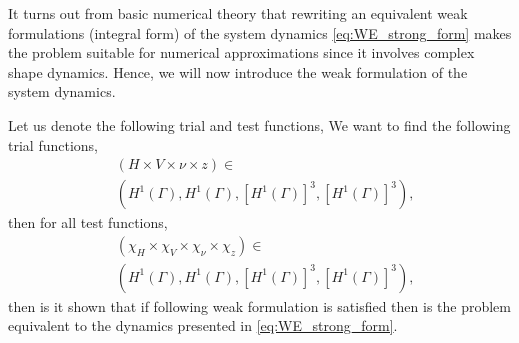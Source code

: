 It turns out from basic numerical theory that rewriting an equivalent weak formulations (integral form) of the system dynamics \eqref{eq:WE_strong_form} makes the problem suitable for numerical approximations since it involves complex shape dynamics.
Hence, we will now introduce the weak formulation of the system dynamics.

Let us denote the following trial and test functions,
We want to find the following trial functions,
\[
    \begin{split}
& ( H \times V \times \nu  \times z ) \in \\
&\left( H^{1}\left( \Gamma  \right), H^1 \left( \Gamma  \right), \left[ H^{1} \left( \Gamma  \right)  \right] ^3, \left[ H^{1}\left( \Gamma  \right)  \right]^3   \right),
    \end{split}
\]
then for all test functions,
\[
    \begin{split}
& ( \chi_{H}  \times \chi _{V} \times \chi _{\nu }  \times \chi _{z} ) \in \\
 &\left( H^{1}\left( \Gamma  \right), H^1 \left( \Gamma  \right), \left[ H^{1} \left( \Gamma  \right)  \right] ^3, \left[ H^{1}\left( \Gamma  \right)  \right]^3   \right),
    \end{split}
\]
 then is it shown that if following weak formulation is satisfied then is the problem equivalent to the dynamics presented in \eqref{eq:WE_strong_form}.

